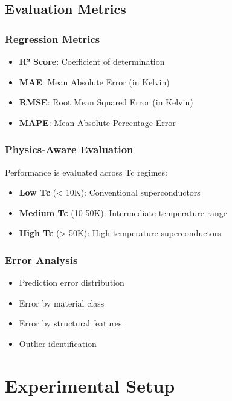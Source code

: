 \documentclass[11pt,a4paper]{article}
\begin{document}
\subsection{Evaluation Metrics}

\subsubsection{Regression Metrics}

\begin{itemize}
    \item \textbf{R² Score}: Coefficient of determination
    \item \textbf{MAE}: Mean Absolute Error (in Kelvin)
    \item \textbf{RMSE}: Root Mean Squared Error (in Kelvin)
    \item \textbf{MAPE}: Mean Absolute Percentage Error
\end{itemize}

\subsubsection{Physics-Aware Evaluation}

Performance is evaluated across Tc regimes:

\begin{itemize}
    \item \textbf{Low Tc} (< 10K): Conventional superconductors
    \item \textbf{Medium Tc} (10-50K): Intermediate temperature range
    \item \textbf{High Tc} (> 50K): High-temperature superconductors
\end{itemize}

\subsubsection{Error Analysis}

\begin{itemize}
    \item Prediction error distribution
    \item Error by material class
    \item Error by structural features
    \item Outlier identification
\end{itemize}

\section{Experimental Setup}
\end{document}
